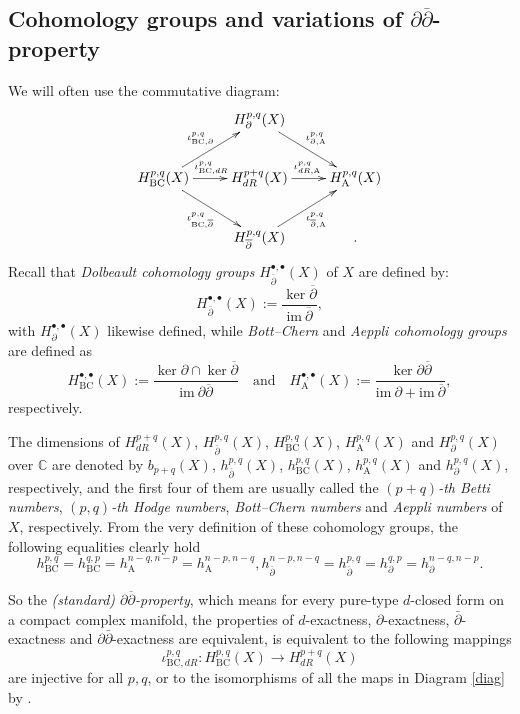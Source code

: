 \documentclass[12pt]{amsart}
\numberwithin{equation}{section}
\theoremstyle{definition}
\theoremstyle{definition}
\theoremstyle{definition}
\newcommand{\im}{\mathrm{im}}
\renewcommand{\1}{\mathsf{1}}
\newcommand{\db}{\overline{\partial}}
\renewcommand{\>}{\rightarrow}
\newcommand{\p}{\partial}
\newcommand{\bp}{\overline\partial}
\def\p{\partial}
\def\b{\bar}
\theoremstyle{plain} %
\theoremstyle{plain} %
\theoremstyle{plain} %
\begin{document}
\subsection{Cohomology groups and variations of $\p\bp$-property}\label{section Variations ofddbar}
	We will often use the commutative diagram:
	\begin{equation}\label{diag}
		\xymatrix{      & H^{p,q}_{\p}(X) \ar[dr]^{\iota^{p,q}_{\p,\mathrm{A}}} &            \\
			H^{p,q}_{\mathrm {BC}}(X) \ar[ur]^{\iota^{p,q}_{\mathrm {BC},\p}} \ar[dr]_{\iota^{p,q}_{\mathrm {BC},\db}} \ar[r]^{\iota^{p,q}_{\mathrm {BC},dR}} &  H^{p+q}_{dR}(X)\ar[r]^{\iota^{p,q}_{dR,\mathrm{A}}} &  H^{p,q}_{\mathrm{A}}(X)  \\
			& H^{p,q}_{\db}(X) \ar[ur]_{\iota^{p,q}_{\db,\mathrm{A}}} &         . }
	\end{equation}
	Recall that \textit{Dolbeault cohomology groups} $H^{\bullet,\bullet}_{\db}(X)$ of $X$ are defined by:
	$$H^{\bullet,\bullet}_{\db}(X):=\frac{\ker\db}{\im\ \db},$$
	with $H^{\bullet,\bullet}_{\p}(X)$ likewise defined, while \textit{Bott--Chern} and \textit{Aeppli cohomology groups} are defined as \begin{equation}\label{Bottchern coho}
		H^{\bullet,\bullet}_{\mathrm {BC}}(X):=\frac{\ker \p\cap \ker\db}{\im\ \p\db}\quad
		\text{and}\quad H^{\bullet,\bullet}_{\mathrm{A}}(X):=\frac{\ker \p\db}{\im\ \p+\im\ \db},
	\end{equation}
	respectively. 
    
    The dimensions of $H^{p+q}_{dR}(X)$, $H^{p,q}_{\db}(X)$, $H^{p,q}_{\mathrm {BC}}(X)$, $H^{p,q}_{\mathrm{A}}(X)$ and $H^{p,q}_{\p}(X)$ over $\mathbb{C}$
	are denoted by $b_{p+q}(X)$, $h^{p,q}_{\db}(X)$, $h^{p,q}_{\mathrm {BC}}(X)$, $h^{p,q}_{\mathrm{A}}(X)$ and $h^{p,q}_{\p}(X)$, respectively, and the first four of them
	are usually called the \textit{$(p+q)$-th Betti numbers}, \textit{$(p,q)$-th Hodge numbers}, \textit{Bott--Chern numbers} and \textit{Aeppli numbers} of $X$, respectively. From the very definition of these cohomology groups,
	the following equalities clearly hold
	\begin{equation*} \label{dual Aeppli}
		h^{p,q}_{\mathrm {BC}} = h^{q,p}_{\mathrm {BC}}=h^{n-q,n-p}_{\mathrm{A}}=h^{n-p,n-q}_{\mathrm{A}},  h^{n-p,n-q}_{\db}=h^{p,q}_{\db}=h^{q,p}_{\p}=h^{n-q,n-p}_{\p}.
	\end{equation*}
	
	So the \textit{(standard) $\p\db$-property},  which means for every pure-type $d$-closed form on a compact complex manifold, the properties of
	$d$-exactness, $\p$-exactness, $\b{\p}$-exactness and
	$\p\b{\p}$-exactness are equivalent, is equivalent to the following mappings
	$$\iota^{p,q}_{\mathrm {BC},dR}: H^{p,q}_{\mathrm {BC}}(X)\longrightarrow H^{p+q}_{dR}(X)$$
	are injective for all $p,q$, or to the isomorphisms of all the maps in Diagram \eqref{diag} by \cite[Remark 5.16]{DGMS75}.
	
\end{document}
